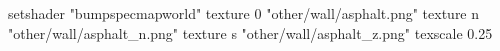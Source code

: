setshader "bumpspecmapworld"
   texture 0 "other/wall/asphalt.png"
   texture n "other/wall/asphalt_n.png"
   texture s "other/wall/asphalt_z.png"
texscale 0.25